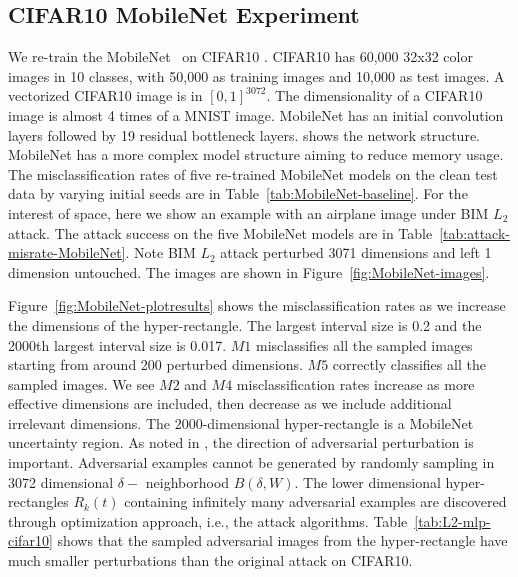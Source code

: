 \documentclass[12pt]{article}
\begin{document}
\subsection{CIFAR10 MobileNet Experiment}
We re-train the 
MobileNet~\cite{mobilenetv2-2018} on CIFAR10 \cite{cifar10}. CIFAR10
has 60,000 32x32 color images in 10 classes, with 50,000 as training images
and 10,000 as test images. A vectorized CIFAR10 image is in
$[0,1]^{3072}$. The dimensionality of a CIFAR10 image is almost 4
times of a MNIST image.
MobileNet has an initial convolution layers followed
by 19 residual bottleneck layers. \cite{mobilenetv2-2018} shows the
network structure. MobileNet has a more complex model structure
aiming to reduce memory usage.  
The misclassification rates of five re-trained MobileNet models on the
clean test data by varying
initial seeds are in Table~\ref{tab:MobileNet-baseline}. 
For the interest of space, here we show an example with an airplane image
under BIM $L_2$ attack. The attack success on the five MobileNet
models are in Table~\ref{tab:attack-misrate-MobileNet}. Note BIM $L_2$
attack perturbed 3071 dimensions and left 1 dimension untouched. 
The images are shown in Figure~\ref{fig:MobileNet-images}. 

Figure~\ref{fig:MobileNet-plotresults} shows the misclassification
rates as we increase the dimensions of the hyper-rectangle. 
The largest interval size is 0.2 and the 2000th largest interval size
is 0.017. $M1$ misclassifies all the sampled images starting from 
around 200 perturbed dimensions. $M5$ correctly classifies all the
sampled images. We see $M2$ and $M4$ misclassification rates increase
as more effective dimensions are included, then decrease as we
include additional irrelevant dimensions. The 2000-dimensional
hyper-rectangle is a MobileNet uncertainty region. 
As noted in \cite{explain-adexample-2015}, the direction of
adversarial perturbation is important. Adversarial examples cannot be
generated by randomly sampling in 3072 dimensional $\delta-$
neighborhood $B(\delta,W)$. The lower dimensional
hyper-rectangles $R_k(t)$ containing infinitely many 
adversarial examples are discovered through
optimization approach, i.e., the attack algorithms. 
Table~\ref{tab:L2-mlp-cifar10} shows that the sampled adversarial
images from the hyper-rectangle have much smaller perturbations than
the original attack on CIFAR10.  
\end{document}
